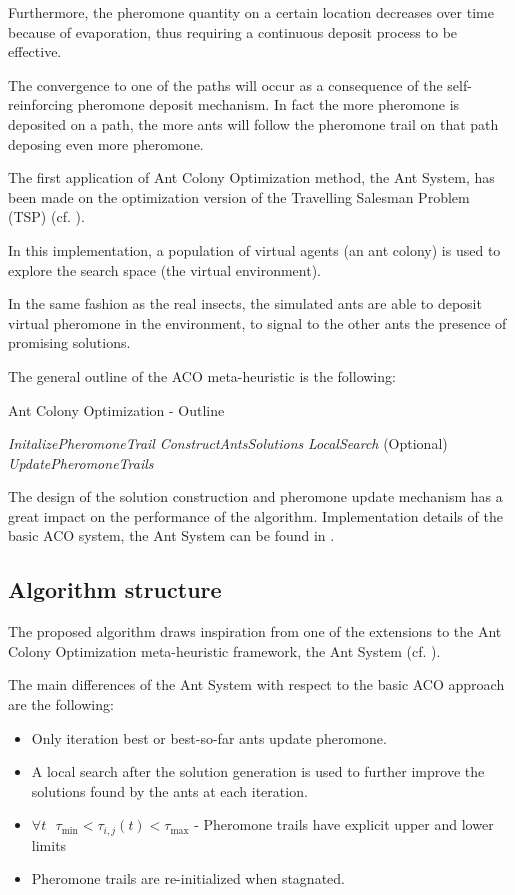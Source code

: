 \begin{homeworkProblem}
Furthermore, the pheromone quantity on a certain location decreases over time because of evaporation, thus requiring a continuous deposit process to be effective.

The convergence to one of the paths will occur as a consequence of the self-reinforcing pheromone deposit mechanism.
In fact the more pheromone is deposited on a path, the more ants will follow the pheromone trail on that path deposing even more pheromone.

The first application of Ant Colony Optimization method, the Ant System, has been made on the optimization version of the Travelling Salesman Problem (TSP) (cf. \cite{dorigo1996ant}).

In this implementation, a population of virtual agents (an ant colony) is used to explore the search space (the virtual environment).

In the same fashion as the real insects, the simulated ants are able to deposit virtual pheromone in the environment, to signal to the other ants the presence of promising solutions.

The general outline of the ACO meta-heuristic is the following: 

\begin{algorithm}[!h]
  \caption{Ant Colony Optimization - Outline}\label{aco:outline}
  \begin{algorithmic}[1]
    \State \emph{InitalizePheromoneTrail} 
        \State \emph{ConstructAntsSolutions}
        \State \emph{LocalSearch} (Optional)
        \State \emph{UpdatePheromoneTrails}
    \EndWhile
\end{algorithmic}
\end{algorithm}

The design of the solution construction and pheromone update mechanism has a great impact on the performance of the algorithm.
Implementation details of the basic ACO system, the Ant System can be found in \cite{dorigo2006artificial}.

\subsection{Algorithm structure} \label{sec:algstrucACO}
The proposed algorithm draws inspiration from one of the extensions to the Ant Colony Optimization meta-heuristic framework, the \maxmin Ant System (cf. \cite{stutzle2000max}).

The main differences of the \maxmin Ant System with respect to the basic ACO approach are the following:
\begin{itemize}
  \item Only iteration best or best-so-far ants update pheromone.
  \item A local search after the solution generation is used to further improve the solutions found by the ants at each iteration.
  \item $\forall t \text{ } \tau_{\min} < \tau_{i,j}(t) < \tau_{\max}  $ - Pheromone trails have explicit upper and lower limits
  \item Pheromone trails are re-initialized when stagnated.
\end{itemize}


\end{homeworkProblem}
